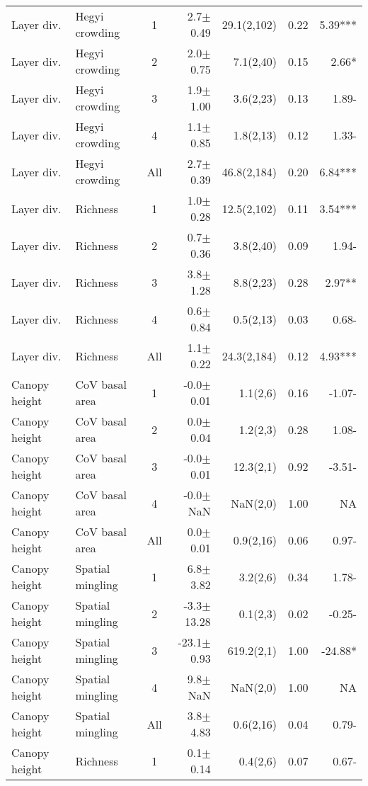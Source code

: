 \begin{longtable}{llcrrS[table-format=1.2]r}
   \midrule
Layer div. & Hegyi crowding & 1 & 2.7$\pm$0.49 & 29.1(2,102) & 0.22 & 5.39*** \\ 
  Layer div. & Hegyi crowding & 2 & 2.0$\pm$0.75 & 7.1(2,40) & 0.15 & 2.66* \\ 
  Layer div. & Hegyi crowding & 3 & 1.9$\pm$1.00 & 3.6(2,23) & 0.13 & 1.89- \\ 
  Layer div. & Hegyi crowding & 4 & 1.1$\pm$0.85 & 1.8(2,13) & 0.12 & 1.33- \\ 
  Layer div. & Hegyi crowding & All & 2.7$\pm$0.39 & 46.8(2,184) & 0.20 & 6.84*** \\ 
   \midrule
Layer div. & Richness & 1 & 1.0$\pm$0.28 & 12.5(2,102) & 0.11 & 3.54*** \\ 
  Layer div. & Richness & 2 & 0.7$\pm$0.36 & 3.8(2,40) & 0.09 & 1.94- \\ 
  Layer div. & Richness & 3 & 3.8$\pm$1.28 & 8.8(2,23) & 0.28 & 2.97** \\ 
  Layer div. & Richness & 4 & 0.6$\pm$0.84 & 0.5(2,13) & 0.03 & 0.68- \\ 
  Layer div. & Richness & All & 1.1$\pm$0.22 & 24.3(2,184) & 0.12 & 4.93*** \\ 
   \midrule
Canopy height & CoV basal area & 1 & -0.0$\pm$0.01 & 1.1(2,6) & 0.16 & -1.07- \\ 
  Canopy height & CoV basal area & 2 & 0.0$\pm$0.04 & 1.2(2,3) & 0.28 & 1.08- \\ 
  Canopy height & CoV basal area & 3 & -0.0$\pm$0.01 & 12.3(2,1) & 0.92 & -3.51- \\ 
  Canopy height & CoV basal area & 4 & -0.0$\pm$NaN & NaN(2,0) & 1.00 & NA \\ 
  Canopy height & CoV basal area & All & 0.0$\pm$0.01 & 0.9(2,16) & 0.06 & 0.97- \\ 
   \midrule
Canopy height & Spatial mingling & 1 & 6.8$\pm$3.82 & 3.2(2,6) & 0.34 & 1.78- \\ 
  Canopy height & Spatial mingling & 2 & -3.3$\pm$13.28 & 0.1(2,3) & 0.02 & -0.25- \\ 
  Canopy height & Spatial mingling & 3 & -23.1$\pm$0.93 & 619.2(2,1) & 1.00 & -24.88* \\ 
  Canopy height & Spatial mingling & 4 & 9.8$\pm$NaN & NaN(2,0) & 1.00 & NA \\ 
  Canopy height & Spatial mingling & All & 3.8$\pm$4.83 & 0.6(2,16) & 0.04 & 0.79- \\ 
   \midrule
Canopy height & Richness & 1 & 0.1$\pm$0.14 & 0.4(2,6) & 0.07 & 0.67- \\ 

\end{longtable}

